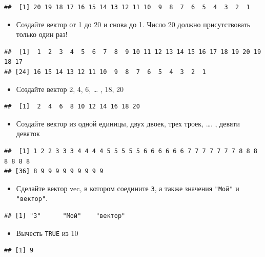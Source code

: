 \documentclass[]{book}
\providecommand{\tightlist}{%
  \setlength{\itemsep}{0pt}\setlength{\parskip}{0pt}}
\begin{document}
\begin{verbatim}
##  [1] 20 19 18 17 16 15 14 13 12 11 10  9  8  7  6  5  4  3  2  1
\end{verbatim}

\begin{itemize}
\tightlist
\item
  Создайте вектор от 1 до 20 и снова до 1. Число 20 должно присутствовать только один раз!
\end{itemize}

\begin{verbatim}
##  [1]  1  2  3  4  5  6  7  8  9 10 11 12 13 14 15 16 17 18 19 20 19 18 17
## [24] 16 15 14 13 12 11 10  9  8  7  6  5  4  3  2  1
\end{verbatim}

\begin{itemize}
\tightlist
\item
  Создайте вектор 2, 4, 6, \ldots{} , 18, 20
\end{itemize}

\begin{verbatim}
##  [1]  2  4  6  8 10 12 14 16 18 20
\end{verbatim}

\begin{itemize}
\tightlist
\item
  Создайте вектор из одной единицы, двух двоек, трех троек, \ldots. , девяти девяток
\end{itemize}

\begin{verbatim}
##  [1] 1 2 2 3 3 3 4 4 4 4 5 5 5 5 5 6 6 6 6 6 6 7 7 7 7 7 7 7 8 8 8 8 8 8 8
## [36] 8 9 9 9 9 9 9 9 9 9
\end{verbatim}

\begin{itemize}
\tightlist
\item
  Сделайте вектор vec, в котором соедините \texttt{3}, а также значения \texttt{"Мой"} и \texttt{"вектор"}.
\end{itemize}

\begin{verbatim}
## [1] "3"      "Мой"    "вектор"
\end{verbatim}

\begin{itemize}
\tightlist
\item
  Вычесть \texttt{TRUE} из 10
\end{itemize}

\begin{verbatim}
## [1] 9
\end{verbatim}
\end{document}
